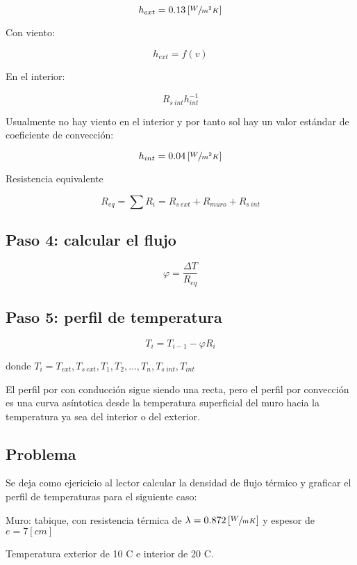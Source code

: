\documentclass[12pt]{article}
\begin{document}
\[ h_{ ext } = 0.13 \left[ \sfrac{ W }{ m ^ 2 K } \right] \]

Con viento:

\[ h_{ ext } = f \left( v \right) \]

En el interior:

\[ R_{ s \ int } h_{ int } ^{ -1 } \]

Usualmente no hay viento en el interior y por tanto sol hay un valor estándar de coeficiente de convección:

\[ h_{ int } = 0.04 \left[ \sfrac{ W }{ m ^ 2 K } \right] \]

Resistencia equivalente

\[ R_{ eq } = \sum{ R_i } = R_{ s \ ext } + R_{ muro } + R_{ s \ int } \]

\subsection{Paso 4: calcular el flujo}

\[ \varphi = \frac{ \Delta T }{ R_{ eq } } \]

\subsection{Paso 5: perfil de temperatura}

\[ T_i = T_{ i - 1 } - \varphi R_i \]

donde $ T_i = T_{ ext }, T_{ s \ ext }, T_1, T_2, \ldots , T_n, T_{s \ int }, T_{ int } $

El perfil por con conducción sigue siendo una recta, pero el perfil por convección es una curva asíntotica desde la temperatura superficial del muro hacia la temperatura ya sea del interior o del exterior.

\subsection*{ Problema }

Se deja como ejericicio al lector calcular la densidad de flujo térmico y graficar el perfil de temperaturas para el siguiente caso:

Muro: tabique, con resistencia térmica de $ \lambda = 0.872 \left[ \sfrac{ W }{ m K } \right] $ y espesor de $ e = 7 \left[ cm \right]$

Temperatura exterior de 10 \degree C e interior de 20 \degree C.

\[ \]

\[ \]

\[ \]

\end{document}
